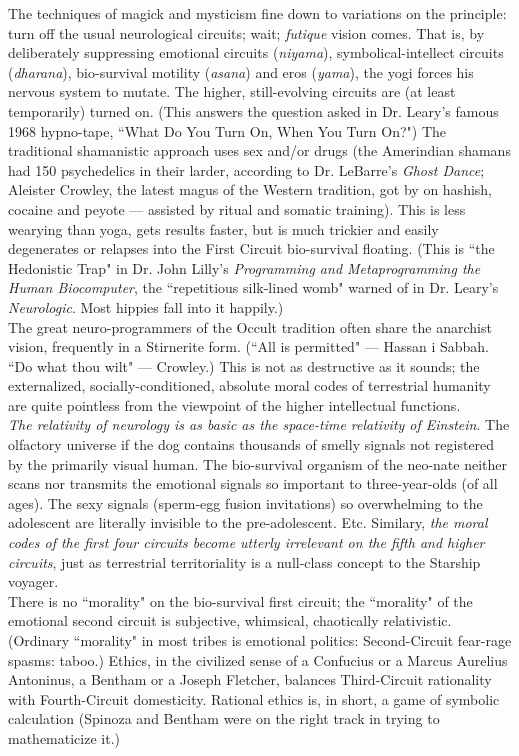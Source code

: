 \documentclass[12pt, onecolumn, letterpaper, oneside]{book}
\begin{document}
The techniques of magick and mysticism fine down to variations on the principle: turn off the usual neurological circuits; wait; \emph{futique} vision comes. That is, by deliberately suppressing emotional circuits (\emph{niyama}), symbolical-intellect circuits (\emph{dharana}), bio-survival motility (\emph{asana}) and eros (\emph{yama}), the yogi forces his nervous system to mutate. The higher, still-evolving circuits are (at least temporarily) turned on. (This answers the question asked in Dr. Leary's famous 1968 hypno-tape, ``What Do You Turn On, When You Turn On?") The traditional shamanistic approach uses sex and/or drugs (the Amerindian shamans had 150 psychedelics in their larder, according to Dr. LeBarre's \emph{Ghost Dance}; Aleister Crowley, the latest magus of the Western tradition, got by on hashish, cocaine and peyote --- assisted by ritual and somatic training). This is less wearying than yoga, gets results faster, but is much trickier and easily degenerates or relapses into the First Circuit bio-survival floating. (This is ``the Hedonistic Trap" in Dr. John Lilly's \emph{Programming and Metaprogramming the Human Biocomputer}, the ``repetitious silk-lined womb" warned of in Dr. Leary's \emph{Neurologic}. Most hippies fall into it happily.)\\
The great neuro-programmers of the Occult tradition often share the anarchist vision, frequently in a Stirnerite form. (``All is permitted" --- Hassan i Sabbah. ``Do what thou wilt" --- Crowley.) This is not as destructive as it sounds; the externalized, socially-conditioned, absolute moral codes of terrestrial humanity are quite pointless from the viewpoint of the higher intellectual functions.\\
\emph{The relativity of neurology is as basic as the space-time relativity of Einstein}. The olfactory universe if the dog contains thousands of smelly signals not registered by the primarily visual human. The bio-survival organism of the neo-nate neither scans nor transmits the emotional signals so important to three-year-olds (of all ages). The sexy signals (sperm-egg fusion invitations) so overwhelming to the adolescent are literally invisible to the pre-adolescent. Etc. Similary, \emph{the moral codes of the first four circuits become utterly irrelevant on the fifth and higher circuits}, just as terrestrial territoriality is a null-class concept to the Starship voyager.\\
There is no ``morality" on the bio-survival first circuit; the ``morality" of the emotional second circuit is subjective, whimsical, chaotically relativistic. (Ordinary ``morality" in most tribes is emotional politics: Second-Circuit fear-rage spasms: taboo.) Ethics, in the civilized sense of a Confucius or a Marcus Aurelius Antoninus, a Bentham or a Joseph Fletcher, balances Third-Circuit rationality with Fourth-Circuit domesticity. Rational ethics is, in short, a game of symbolic calculation (Spinoza and Bentham were on the right track in trying to mathematicize it.)\\
\end{document}
